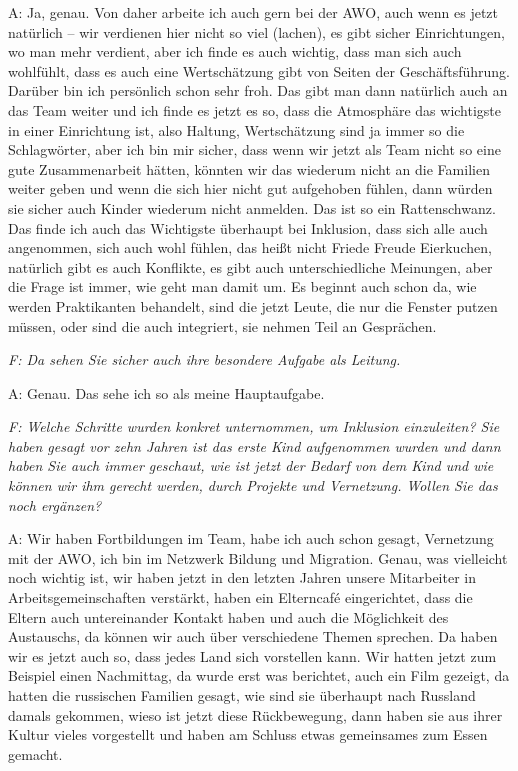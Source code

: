 A: Ja, genau. Von daher arbeite ich auch gern bei der AWO, auch wenn es jetzt natürlich -- wir verdienen hier nicht so viel (lachen), es gibt sicher Einrichtungen, wo man mehr verdient, aber ich finde es auch wichtig, dass man sich auch wohlfühlt, dass es auch eine Wertschätzung gibt von Seiten der Geschäftsführung. Darüber bin ich persönlich schon sehr froh. Das gibt man dann natürlich auch an das Team weiter und ich finde es jetzt es so, dass die Atmosphäre das wichtigste in einer Einrichtung ist, also Haltung, Wertschätzung sind ja immer so die Schlagwörter, aber ich bin mir sicher, dass wenn wir jetzt als Team nicht so eine gute Zusammenarbeit hätten, könnten wir das wiederum nicht an die Familien weiter geben und wenn die sich hier nicht gut aufgehoben fühlen, dann würden sie sicher auch Kinder wiederum nicht anmelden. Das ist so ein Rattenschwanz. Das finde ich auch das Wichtigste überhaupt bei Inklusion, dass sich alle auch angenommen, sich auch wohl fühlen, das heißt nicht Friede Freude Eierkuchen, natürlich gibt es auch Konflikte, es gibt auch unterschiedliche Meinungen, aber die Frage ist immer, wie geht man damit um. Es beginnt auch schon da, wie werden Praktikanten behandelt, sind die jetzt Leute, die nur die Fenster putzen müssen, oder sind die auch integriert, sie nehmen Teil an Gesprächen. 

\emph{F: Da sehen Sie sicher auch ihre besondere Aufgabe als Leitung.}

A: Genau. Das sehe ich so als meine Hauptaufgabe. 

\emph{F: Welche Schritte wurden konkret unternommen, um Inklusion einzuleiten? Sie haben gesagt vor zehn Jahren ist das erste Kind aufgenommen wurden und dann haben Sie auch immer geschaut, wie ist jetzt der Bedarf von dem Kind und wie können wir ihm gerecht werden, durch Projekte und Vernetzung. Wollen Sie das noch ergänzen?}

A: Wir haben Fortbildungen im Team, habe ich auch schon gesagt, Vernetzung mit der AWO, ich bin im Netzwerk Bildung und Migration. Genau, was vielleicht noch wichtig ist, wir haben jetzt in den letzten Jahren unsere Mitarbeiter in Arbeitsgemeinschaften verstärkt, haben ein Elterncafé eingerichtet, dass die Eltern auch untereinander Kontakt haben und auch die Möglichkeit des Austauschs, da können wir auch über verschiedene Themen sprechen. Da haben wir es jetzt auch so, dass jedes Land sich vorstellen kann. Wir hatten jetzt zum Beispiel einen Nachmittag, da wurde erst was berichtet, auch ein Film gezeigt, da hatten die russischen Familien gesagt, wie sind sie überhaupt nach Russland damals gekommen, wieso ist jetzt diese Rückbewegung, dann haben sie aus ihrer Kultur vieles vorgestellt und haben am Schluss etwas gemeinsames zum Essen gemacht.

